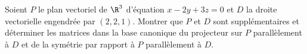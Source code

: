 \begin{enonce}
\begin{exercise}[ID={RMS133 E1398},subtitle={IMT PC 2022},tags={},difficulty={}]
  Soient $P$ le plan vectoriel de $\R^3$ d'équation $x-2y+3z=0$ et $D$ la droite vectorielle engendrée par $(2,2,1)$.
  Montrer que $P$ et $D$ sont supplémentaires et déterminer les matrices dans la base canonique du projecteur sur $P$ parallèlement à $D$ et de la symétrie par rapport à $P$ parallèlement à $D$.
\end{exercise}
\begin{solution}
\end{solution}
\end{enonce}
